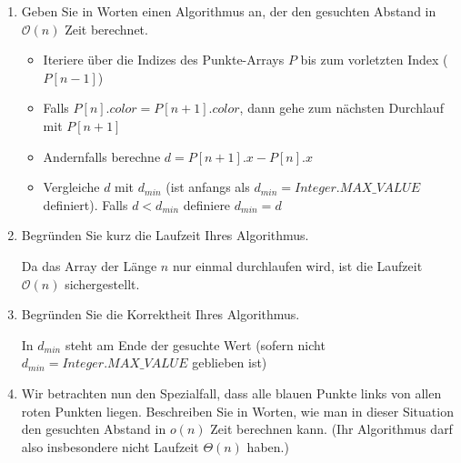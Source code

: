 \documentclass{lehramt-informatik-aufgabe}
\begin{document}
\begin{enumerate}


\item Geben Sie in Worten einen Algorithmus an, der den gesuchten
Abstand in $\mathcal{O}(n)$ Zeit berechnet.

\begin{liAntwort}
\begin{itemize}
\item Iteriere über die Indizes des Punkte-Arrays $P$ bis zum vorletzten
Index ($P[n-1]$)

\item Falls $P[n].color = P[n + 1].color$, dann gehe zum nächsten
Durchlauf mit $P[n + 1]$

\item Andernfalls berechne $d = P[n + 1].x - P[n].x$

\item Vergleiche $d$ mit $d_{min}$ (ist anfangs als $d_{min} =
Integer.MAX\_VALUE$ definiert). Falls $d < d_{min}$ definiere $d_{min} =
d$
\end{itemize}


\end{liAntwort}


\item Begründen Sie kurz die Laufzeit Ihres Algorithmus.

\begin{liAntwort}
Da das Array der Länge $n$ nur einmal durchlaufen wird, ist die Laufzeit
$\mathcal{O}(n)$ sichergestellt.
\end{liAntwort}


\item Begründen Sie die Korrektheit Ihres Algorithmus.

\begin{liAntwort}
In $d_{min}$ steht am Ende der gesuchte Wert (sofern nicht $d_{min} =
Integer.MAX\_VALUE$ geblieben ist)
\end{liAntwort}


\item Wir betrachten nun den Spezialfall, dass alle blauen Punkte links
von allen roten Punkten liegen. Beschreiben Sie in Worten, wie man in
dieser Situation den gesuchten Abstand in $o(n)$ Zeit berechnen kann. (Ihr
Algorithmus darf also insbesondere nicht Laufzeit $\Theta(n)$ haben.)


\end{enumerate}
\end{document}
